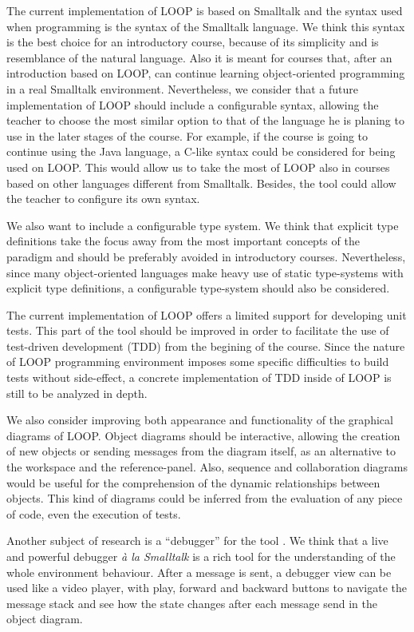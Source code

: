 \documentclass{sigplanconf}
\begin{document}
The current implementation of LOOP is based on Smalltalk and the syntax used when programming is the syntax of the Smalltalk language. We think this syntax is the best choice for an introductory course, because of its simplicity and is resemblance of the natural language. Also it is meant for courses that, after an introduction based on LOOP, can continue learning object-oriented programming in a real Smalltalk environment. Nevertheless, we consider that a future implementation of LOOP should include a configurable syntax, allowing the teacher to choose the most similar option to that of the language he is planing to use in the later stages of the course. For example, if the course is going to continue using the Java language, a C-like syntax could be considered for being used on LOOP. This would allow us to take the most of LOOP also in courses based on other languages different from Smalltalk. Besides, the tool could allow the teacher to configure its own syntax.

We also want to include a configurable type system. We think that explicit type definitions take the focus away from the most important concepts of the paradigm and should be preferably avoided in introductory courses. Nevertheless, since many object-oriented languages make heavy use of static type-systems with explicit type definitions, a configurable type-system should also be considered.

The current implementation of LOOP offers a limited support for developing unit tests. This part of the tool should be improved in order to facilitate the use of test-driven development (TDD) from the begining of the course. Since the nature of LOOP programming environment imposes some specific difficulties to build tests without side-effect, a concrete implementation of TDD inside of LOOP is still to be analyzed in depth.

We also consider improving both appearance and functionality of the graphical diagrams of LOOP. Object diagrams should be interactive, allowing the creation of new objects or sending messages from the diagram itself, as an alternative to the workspace and the reference-panel. Also, sequence and collaboration diagrams would be useful for the comprehension of the dynamic relationships between objects. This kind of diagrams could be inferred from the evaluation of any piece of code, even the execution of tests.

Another subject of research is a ``debugger'' for the tool \cite{Benn10}. We think that a live and powerful debugger \textit{à la Smalltalk} is a rich tool for the understanding of the whole environment behaviour. 
After a message is sent, a debugger view can be used like a video player, with play, forward and  backward buttons to navigate the message stack and see how the state changes after each message send in the object diagram.
\end{document}
